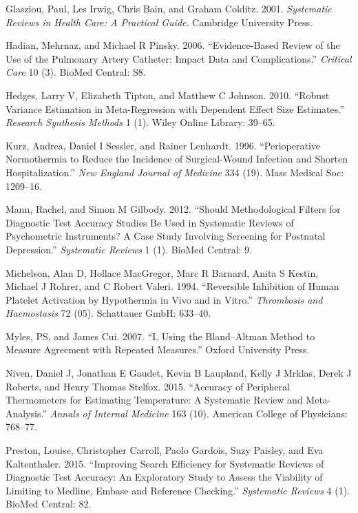 \documentclass[smallextended]{svjour3}       %
\begin{document}
\leavevmode\hypertarget{ref-glasziou2001systematic}{}%
Glasziou, Paul, Les Irwig, Chris Bain, and Graham Colditz. 2001.
\emph{Systematic Reviews in Health Care: A Practical Guide}. Cambridge
University Press.

\leavevmode\hypertarget{ref-hadian2006evidence}{}%
Hadian, Mehrnaz, and Michael R Pinsky. 2006. ``Evidence-Based Review of
the Use of the Pulmonary Artery Catheter: Impact Data and
Complications.'' \emph{Critical Care} 10 (3). BioMed Central: S8.

\leavevmode\hypertarget{ref-hedges2010robust}{}%
Hedges, Larry V, Elizabeth Tipton, and Matthew C Johnson. 2010. ``Robust
Variance Estimation in Meta-Regression with Dependent Effect Size
Estimates.'' \emph{Research Synthesis Methods} 1 (1). Wiley Online
Library: 39--65.

\leavevmode\hypertarget{ref-kurz1996perioperative}{}%
Kurz, Andrea, Daniel I Sessler, and Rainer Lenhardt. 1996.
``Perioperative Normothermia to Reduce the Incidence of Surgical-Wound
Infection and Shorten Hospitalization.'' \emph{New England Journal of
Medicine} 334 (19). Mass Medical Soc: 1209--16.

\leavevmode\hypertarget{ref-mann2012should}{}%
Mann, Rachel, and Simon M Gilbody. 2012. ``Should Methodological Filters
for Diagnostic Test Accuracy Studies Be Used in Systematic Reviews of
Psychometric Instruments? A Case Study Involving Screening for Postnatal
Depression.'' \emph{Systematic Reviews} 1 (1). BioMed Central: 9.

\leavevmode\hypertarget{ref-michelson1994reversible}{}%
Michelson, Alan D, Hollace MacGregor, Marc R Barnard, Anita S Kestin,
Michael J Rohrer, and C Robert Valeri. 1994. ``Reversible Inhibition of
Human Platelet Activation by Hypothermia in Vivo and in Vitro.''
\emph{Thrombosis and Haemostasis} 72 (05). Schattauer GmbH: 633--40.

\leavevmode\hypertarget{ref-myles2007using}{}%
Myles, PS, and James Cui. 2007. ``I. Using the Bland--Altman Method to
Measure Agreement with Repeated Measures.'' Oxford University Press.

\leavevmode\hypertarget{ref-niven2015accuracy}{}%
Niven, Daniel J, Jonathan E Gaudet, Kevin B Laupland, Kelly J Mrklas,
Derek J Roberts, and Henry Thomas Stelfox. 2015. ``Accuracy of
Peripheral Thermometers for Estimating Temperature: A Systematic Review
and Meta-Analysis.'' \emph{Annals of Internal Medicine} 163 (10).
American College of Physicians: 768--77.

\leavevmode\hypertarget{ref-preston2015improving}{}%
Preston, Louise, Christopher Carroll, Paolo Gardois, Suzy Paisley, and
Eva Kaltenthaler. 2015. ``Improving Search Efficiency for Systematic
Reviews of Diagnostic Test Accuracy: An Exploratory Study to Assess the
Viability of Limiting to Medline, Embase and Reference Checking.''
\emph{Systematic Reviews} 4 (1). BioMed Central: 82.
\end{document}
